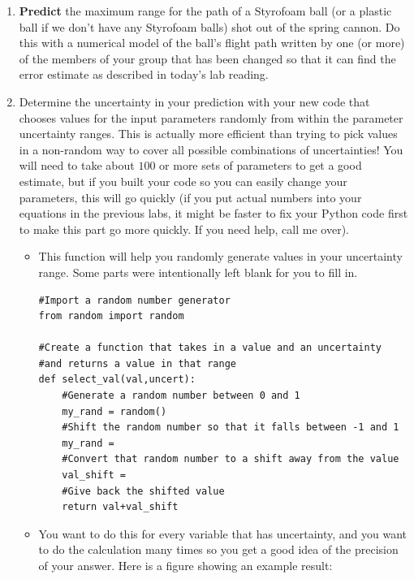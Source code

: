 \documentclass[twoside,11pt,ShortChapTitles]{BYUTextbook}
\begin{document}
\begin{enumerate}
\item \textbf{Predict} the maximum range for the path of a Styrofoam ball
(or a plastic ball if we don't have any Styrofoam balls) shot out of the
spring cannon. Do this with a numerical model of the ball's flight path
written by one (or more) of the members of your group that has been changed
so that it can find the error estimate as described in today's lab reading.

\item Determine the uncertainty in your prediction with your new code that
chooses values for the input parameters randomly from within the parameter
uncertainty ranges. This is actually more efficient than trying to pick
values in a non-random way to cover all possible combinations of
uncertainties! You will need to take about $100$ or more sets of parameters
to get a good estimate, but if you built your code so you can easily change
your parameters, this will go quickly (if you put actual numbers into your
equations in the previous labs, it might be faster to fix your Python code
first to make this part go more quickly. If you need help, call me over).


\begin{itemize}
\item This function will help you randomly generate values in your uncertainty range.  Some parts were intentionally left blank for you to fill in.
\begin{Verbatim}
#Import a random number generator
from random import random

#Create a function that takes in a value and an uncertainty
#and returns a value in that range
def select_val(val,uncert):
    #Generate a random number between 0 and 1
    my_rand = random()
    #Shift the random number so that it falls between -1 and 1
    my_rand =
    #Convert that random number to a shift away from the value
    val_shift =
    #Give back the shifted value
    return val+val_shift

\end{Verbatim}



\item You want to do this for every variable that has
uncertainty, and you want to do the calculation many times so you get a good
idea of the precision of your answer. Here is a figure showing an example
result:


\end{itemize}
\end{enumerate}
\end{document}
